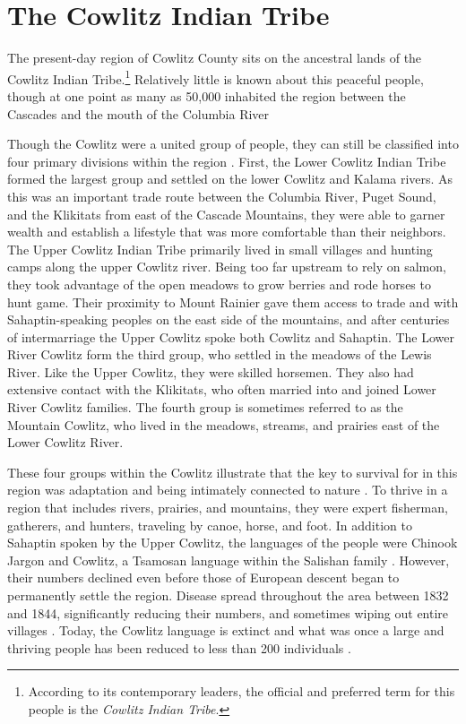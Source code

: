 \section{The Cowlitz Indian Tribe}

The present-day region of Cowlitz County sits on the ancestral lands of the Cowlitz Indian Tribe.\footnote{According to its contemporary leaders, the official and preferred term for this people is the \textit{Cowlitz Indian Tribe}.} Relatively little is known about this peaceful people, though at one point as many as 50,000 inhabited the region between the Cascades and the mouth of the Columbia River \citep[70]{olson_1948}

Though the Cowlitz were a united group of people, they can still be classified into four primary divisions within the region \citep[8-10]{urrutia_1998}. First, the Lower Cowlitz Indian Tribe formed the largest group and settled on the lower Cowlitz and Kalama rivers. As this was an important trade route between the Columbia River, Puget Sound, and the Klikitats from east of the Cascade Mountains, they were able to garner wealth and establish a lifestyle that was more comfortable than their neighbors. The Upper Cowlitz Indian Tribe primarily lived in small villages and hunting camps along the upper Cowlitz river. Being too far upstream to rely on salmon, they took advantage of the open meadows to grow berries and rode horses to hunt game. Their proximity to Mount Rainier gave them access to trade and with Sahaptin-speaking peoples on the east side of the mountains, and after centuries of intermarriage the Upper Cowlitz spoke both Cowlitz and Sahaptin. The Lower River Cowlitz form the third group, who settled in the meadows of the Lewis River. Like the Upper Cowlitz, they were skilled horsemen. They also had extensive contact with the Klikitats, who often married into and joined Lower River Cowlitz families. The fourth group is sometimes referred to as the Mountain Cowlitz, who lived in the meadows, streams, and prairies east of the Lower Cowlitz River.

These four groups within the Cowlitz illustrate that the key to survival for in this region was adaptation and being intimately connected to nature \citep[10--14]{urrutia_1998}. To thrive in a region that includes rivers, prairies, and mountains, they were expert fisherman, gatherers, and hunters, traveling by canoe, horse, and foot. In addition to Sahaptin spoken by the Upper Cowlitz, the languages of the people were Chinook Jargon and Cowlitz, a Tsamosan language within the Salishan family \citep{lewis_etal_2016_ethnologue}.
However, their numbers declined even before those of European descent began to permanently settle the region. Disease spread throughout the area between 1832 and 1844, significantly reducing their numbers, and sometimes wiping out entire villages \citep[72]{olson_1948}. Today, the Cowlitz language is extinct and what was once a large and thriving people has been reduced to less than 200 individuals \citep{lewis_etal_2016_ethnologue}.

